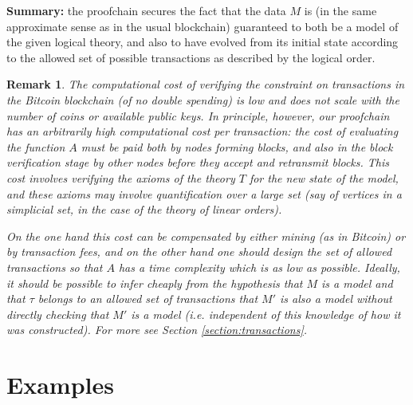 \documentclass[english,letter paper,12pt,reqno]{article}
\theoremstyle{example}
\newtheorem{remark}[theorem]{Remark}
\begin{document}
\textbf{Summary:} the proofchain secures the fact that the data $M$ is (in the same approximate sense as in the usual blockchain) guaranteed to both be a model of the given logical theory, and also to have evolved from its initial state according to the allowed set of possible transactions as described by the logical order.

\begin{remark}\label{remark:computational_cost} The computational cost of verifying the constraint on transactions in the Bitcoin blockchain (of no double spending) is low and does not scale with the number of coins or available public keys. In principle, however, our proofchain has an arbitrarily high computational cost per transaction: the cost of evaluating the function $A$ must be paid both by nodes forming blocks, and also in the block verification stage by other nodes before they accept and retransmit blocks. This cost involves verifying the axioms of the theory $T$ for the new state of the model, and these axioms may involve quantification over a large set (say of vertices in a simplicial set, in the case of the theory of linear orders).

On the one hand this cost can be compensated by either mining (as in Bitcoin) or by transaction fees, and on the other hand one should design the set of allowed transactions so that $A$ has a time complexity which is as low as possible. Ideally, it should be possible to infer cheaply from the hypothesis that $M$ is a model and that $\tau$ belongs to an allowed set of transactions that $M'$ is also a model \emph{without directly checking} that $M'$ is a model (i.e. independent of this knowledge of how it was constructed). For more see Section \ref{section:transactions}.
\end{remark}


\section{Examples}
\end{document}
